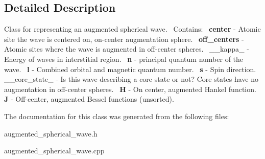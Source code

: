 \subsection{Detailed Description}
Class for representing an augmented spherical wave.~\newline
Contains\+:~\newline
{\bfseries center} -\/ Atomic site the wave is centered on, on-\/center augmentation sphere.~\newline
{\bfseries off\+\_\+centers} -\/ Atomic sites where the wave is augmented in off-\/center spheres.~\newline
\+\_\+\+\_\+kappa\+\_\+ -\/ Energy of waves in interstitial region.~\newline
{\bfseries n} -\/ principal quantum number of the wave.~\newline
{\bfseries l} -\/ Combined orbital and magnetic quantum number.~\newline
{\bfseries s} -\/ Spin direction.~\newline
\+\_\+\+\_\+core\+\_\+state\+\_\+ -\/ Is this wave describing a core state or not? Core states have no augmentation in off-\/center spheres.~\newline
{\bfseries H} -\/ On center, augmented Hankel function.~\newline
{\bfseries J} -\/ Off-\/center, augmented Bessel functions (unsorted).~\newline


The documentation for this class was generated from the following files\+:\begin{DoxyCompactItemize}
\item 
augmented\+\_\+spherical\+\_\+wave.\+h\item 
augmented\+\_\+spherical\+\_\+wave.\+cpp\end{DoxyCompactItemize}
